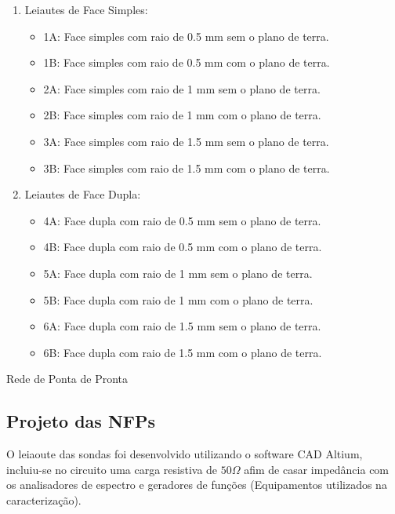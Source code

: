 \begin{enumerate}
 \item Leiautes de Face Simples:
 \begin{itemize}
  \item 1A: Face simples com raio de 0.5 mm sem o plano de terra.
  \item 1B: Face simples com raio de 0.5 mm com o plano de terra.
  \item 2A: Face simples com raio de 1 mm sem o plano de terra.
  \item 2B: Face simples com raio de 1 mm com o plano de terra.
  \item 3A: Face simples com raio de 1.5 mm sem o plano de terra.
  \item 3B: Face simples com raio de 1.5 mm com o plano de terra.
 \end{itemize}
 
  \item Leiautes de Face Dupla:
 \begin{itemize}
  \item 4A: Face dupla com raio de 0.5 mm sem o plano de terra.
  \item 4B: Face dupla com raio de 0.5 mm com o plano de terra.
  \item 5A: Face dupla com raio de 1 mm sem o plano de terra.
  \item 5B: Face dupla com raio de 1 mm com o plano de terra.
  \item 6A: Face dupla com raio de 1.5 mm sem o plano de terra.
  \item 6B: Face dupla com raio de 1.5 mm com o plano de terra.
 \end{itemize}
\end{enumerate}

Rede de Ponta de Pronta

\subsection{Projeto das NFPs}
O leiaoute das sondas foi desenvolvido utilizando o software CAD Altium\textregistered, incluiu-se no circuito uma carga resistiva de $50\Omega$ afim de casar impedância com os analisadores de espectro e geradores de funções (Equipamentos utilizados na caracterização).

